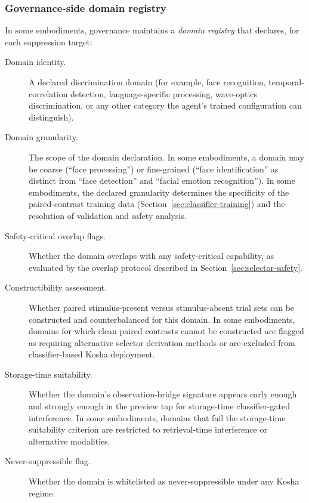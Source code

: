 \documentclass[a4paper,12pt]{article}
\begin{document}
\subsubsection{Governance-side domain registry}
\label{sec:domain-registry}

In some embodiments, governance maintains a \emph{domain registry}
that declares, for each suppression target:

\begin{description}
  \item[Domain identity.] A declared discrimination domain (for
    example, face recognition, temporal-correlation detection,
    language-specific processing, wave-optics discrimination, or any
    other category the agent's trained configuration can distinguish).
  \item[Domain granularity.] The scope of the domain declaration.
    In some embodiments, a domain may be coarse (``face processing'')
    or fine-grained (``face identification'' as distinct from ``face
    detection'' and ``facial emotion recognition''). In some
    embodiments, the declared granularity determines the specificity
    of the paired-contrast training data
    (Section~\ref{sec:classifier-training}) and the resolution of
    validation and safety analysis.
  \item[Safety-critical overlap flags.] Whether the domain overlaps
    with any safety-critical capability, as evaluated by the overlap
    protocol described in Section~\ref{sec:selector-safety}.
  \item[Constructibility assessment.] Whether paired
    stimulus-present versus stimulus-absent trial sets can be
    constructed and counterbalanced for this domain. In some
    embodiments, domains for which clean paired contrasts cannot be
    constructed are flagged as requiring alternative selector
    derivation methods or are excluded from classifier-based
    Kosha deployment.
  \item[Storage-time suitability.] Whether the domain's
    observation-bridge signature appears early enough and strongly
    enough in the preview tap for storage-time classifier-gated
    interference. In some embodiments, domains that fail the
    storage-time suitability criterion are restricted to
    retrieval-time interference or alternative modalities.
  \item[Never-suppressible flag.] Whether the domain is whitelisted
    as never-suppressible under any Kosha regime.
\end{description}
\end{document}
